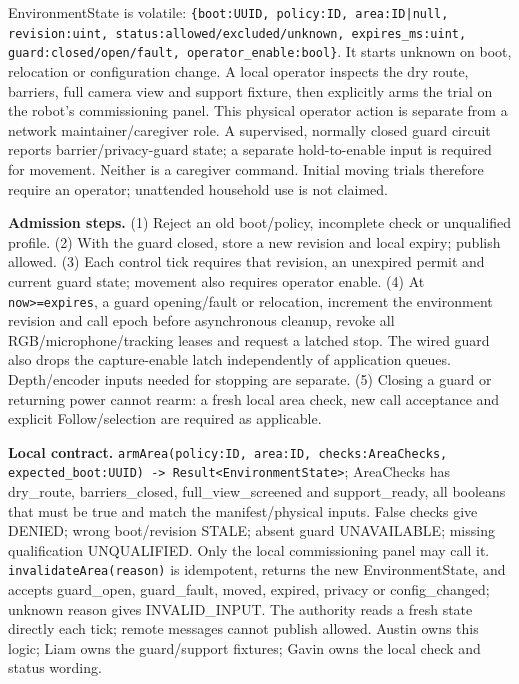 \documentclass[12pt,letterpaper]{article}
\newcommand{\field}[1]{\texttt{#1}}
\begin{document}
EnvironmentState is volatile: \field{\{boot:UUID, policy:ID, area:ID|null, revision:uint, status:allowed/\allowbreak{}excluded/\allowbreak{}unknown, expires\_\allowbreak{}ms:uint, guard:closed/\allowbreak{}open/\allowbreak{}fault, operator\_\allowbreak{}enable:bool\}}. It starts unknown on boot, relocation or configuration change. A local operator inspects the dry route, barriers, full camera view and support fixture, then explicitly arms the trial on the robot's commissioning panel. This physical operator action is separate from a network maintainer/caregiver role. A supervised, normally closed guard circuit reports barrier/privacy-guard state; a separate hold-to-enable input is required for movement. Neither is a caregiver command. Initial moving trials therefore require an operator; unattended household use is not claimed.

\textbf{Admission steps.} (1) Reject an old boot/policy, incomplete check or unqualified profile. (2) With the guard closed, store a new revision and local expiry; publish allowed. (3) Each control tick requires that revision, an unexpired permit and current guard state; movement also requires operator enable. (4) At \field{now>=expires}, a guard opening/fault or relocation, increment the environment revision and call epoch before asynchronous cleanup, revoke all RGB/microphone/tracking leases and request a latched stop. The wired guard also drops the capture-enable latch independently of application queues. Depth/encoder inputs needed for stopping are separate. (5) Closing a guard or returning power cannot rearm: a fresh local area check, new call acceptance and explicit Follow/selection are required as applicable.

\textbf{Local contract.} \field{armArea(policy:ID, area:ID, checks:AreaChecks, expected\_\allowbreak{}boot:UUID) -> Result<EnvironmentState>}; AreaChecks has dry\_\allowbreak{}route, barriers\_\allowbreak{}closed, full\_\allowbreak{}view\_\allowbreak{}screened and support\_\allowbreak{}ready, all booleans that must be true and match the manifest/physical inputs. False checks give DENIED; wrong boot/revision STALE; absent guard UNAVAILABLE; missing qualification UNQUALIFIED. Only the local commissioning panel may call it. \field{invalidateArea(reason)} is idempotent, returns the new EnvironmentState, and accepts guard\_\allowbreak{}open, guard\_\allowbreak{}fault, moved, expired, privacy or config\_\allowbreak{}changed; unknown reason gives INVALID\_\allowbreak{}INPUT. The authority reads a fresh state directly each tick; remote messages cannot publish allowed. Austin owns this logic; Liam owns the guard/support fixtures; Gavin owns the local check and status wording.
\end{document}
